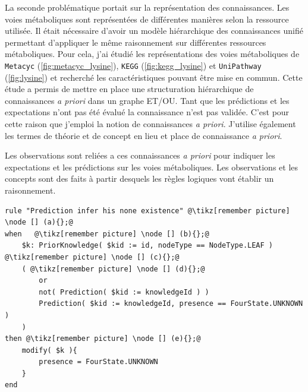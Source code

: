 \begin{refsegment}
La seconde problématique portait sur la représentation des connaissances. Les voies métaboliques sont représentées de différentes manières selon la ressource utilisée. Il était nécessaire d'avoir un modèle hiérarchique des connaissances unifié permettant d'appliquer le même raisonnement sur différentes ressources métaboliques. Pour cela, j'ai étudié les représentations des voies métaboliques de \texttt{Metacyc} (\cref{fig:metacyc_lysine}), \texttt{KEGG} (\cref{fig:kegg_lysine}) et \texttt{UniPathway} (\cref{fig:lysine}) et recherché les caractéristiques pouvant être mise en commun. Cette étude a permis de mettre en place une structuration hiérarchique de connaissances \textit{a priori} dans un graphe ET/OU. Tant que les prédictions et les expectations n'ont pas été évalué la connaissance n'est pas validée. C'est pour cette raison que j'emploi la notion de connaissances \textit{a priori}. J'utilise également les termes de théorie et de concept en lieu et place de connaissance \textit{a priori}. 

Les observations sont reliées a ces connaissances \textit{a priori} pour indiquer les expectations et les prédictions sur les voies métaboliques. Les observations et les concepts sont des faits à partir desquels les règles logiques vont établir un raisonnement. 

\begin{lstlisting}[caption=Inférence de la prédiction d'absence, style=drl-style]
rule "Prediction infer his none existence" @\tikz[remember picture] \node [] (a){};@
when   @\tikz[remember picture] \node [] (b){};@
	$k: PriorKnowledge( $kid := id, nodeType == NodeType.LEAF )   @\tikz[remember picture] \node [] (c){};@
	( @\tikz[remember picture] \node [] (d){};@
		or
		not( Prediction( $kid := knowledgeId ) )
		Prediction( $kid := knowledgeId, presence == FourState.UNKNOWN )
	)
then @\tikz[remember picture] \node [] (e){};@
	modify( $k ){ 
		presence = FourState.UNKNOWN
	}
end
\end{lstlisting}


\end{refsegment}
